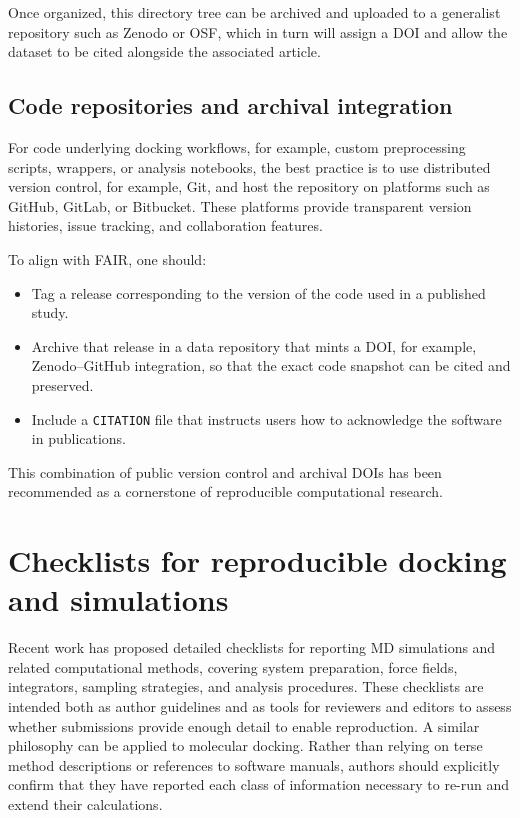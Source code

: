 \documentclass[12pt]{article}
\begin{document}
Once organized, this directory tree can be archived and uploaded to a generalist repository such as Zenodo or OSF, which in turn will assign a DOI and allow the dataset to be cited alongside the associated article.\cite{CH12_uTexasRepos,CH12_aguRepos,CH12_snsfRepos}

\subsection{Code repositories and archival integration}

For code underlying docking workflows, for example, custom preprocessing scripts, wrappers, or analysis notebooks, the best practice is to use distributed version control, for example, Git, and host the repository on platforms such as GitHub, GitLab, or Bitbucket.\cite{CH12_gitRepro2013,CH12_tenOpenDev,CH12_tenCleanOSS} These platforms provide transparent version histories, issue tracking, and collaboration features.

To align with FAIR, one should:

\begin{itemize}
  \item Tag a release corresponding to the version of the code used in a published study.
  \item Archive that release in a data repository that mints a DOI, for example, Zenodo--GitHub integration, so that the exact code snapshot can be cited and preserved.
  \item Include a \texttt{CITATION} file that instructs users how to acknowledge the software in publications.
\end{itemize}

This combination of public version control and archival DOIs has been recommended as a cornerstone of reproducible computational research.\cite{CH12_toolsRepro2016,CH12_gitRepro2013,CH12_barba2022role}

\section{Checklists for reproducible docking and simulations}

Recent work has proposed detailed checklists for reporting MD simulations and related computational methods, covering system preparation, force fields, integrators, sampling strategies, and analysis procedures.\cite{CH12_mdChecklist2023} These checklists are intended both as author guidelines and as tools for reviewers and editors to assess whether submissions provide enough detail to enable reproduction. A similar philosophy can be applied to molecular docking. Rather than relying on terse method descriptions or references to software manuals, authors should explicitly confirm that they have reported each class of information necessary to re-run and extend their calculations.\cite{CH12_plos2025tenDocking}
\end{document}
